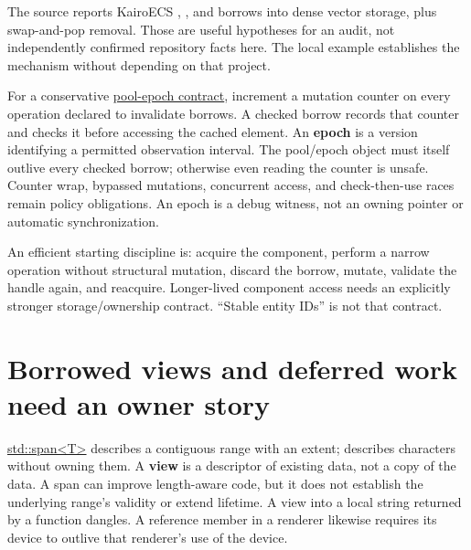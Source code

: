 The source reports KairoECS , , and  borrows into dense vector storage, plus swap-and-pop removal. Those are useful hypotheses for an audit, not independently confirmed repository facts here. The local  example establishes the mechanism without depending on that project.

For a conservative \hyperref[appendix-aa405b7c3903]{pool-epoch contract}, increment a mutation counter on every operation declared to invalidate borrows. A checked borrow records that counter and checks it before accessing the cached element. An \textbf{epoch} is a version identifying a permitted observation interval. The pool/epoch object must itself outlive every checked borrow; otherwise even reading the counter is unsafe. Counter wrap, bypassed mutations, concurrent access, and check-then-use races remain policy obligations. An epoch is a debug witness, not an owning pointer or automatic synchronization.

An efficient starting discipline is: acquire the component, perform a narrow operation without structural mutation, discard the borrow, mutate, validate the handle again, and reacquire. Longer-lived component access needs an explicitly stronger storage/ownership contract. ``Stable entity IDs'' is not that contract.

\section{Borrowed views and deferred work need an owner story}\label{01-foundations-i-ch003-borrowed-views-and-deferred-work-need-an-owner-story}

\hypertarget{01-foundations-i-ch003-borrowed-views-and-deferred-work-need-an-owner-story}{}

\hyperref[appendix-aea529eb5175]{std::span\textless T\textgreater{}} describes a contiguous range with an extent;  describes characters without owning them. A \textbf{view} is a descriptor of existing data, not a copy of the data. A span can improve length-aware code, but it does not establish the underlying range's validity or extend lifetime. A view into a local string returned by a function dangles. A reference member in a renderer likewise requires its device to outlive that renderer's use of the device.

